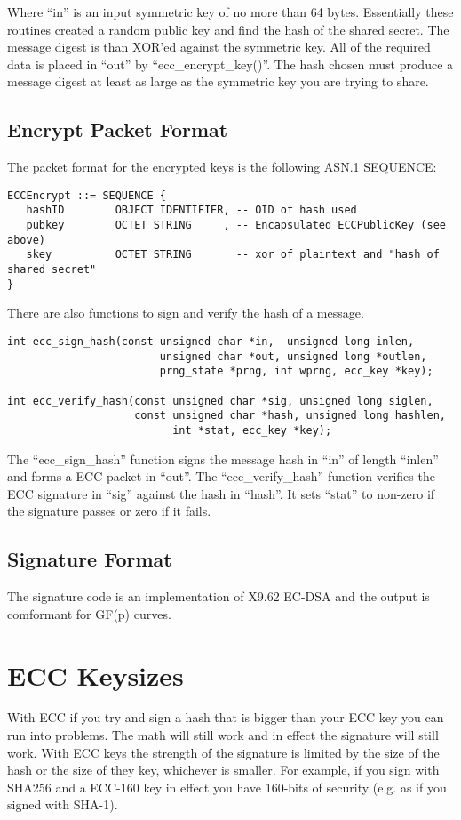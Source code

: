 \documentclass[a4paper]{book}
\begin{document}
Where ``in'' is an input symmetric key of no more than 64 bytes.  Essentially these routines created a random public key
and find the hash of the shared secret.  The message digest is than XOR'ed against the symmetric key.  All of the required
data is placed in ``out'' by ``ecc\_encrypt\_key()''.   The hash chosen must produce a message digest at least as large
as the symmetric key you are trying to share.

\subsection{Encrypt Packet Format}

The packet format for the encrypted keys is the following ASN.1 SEQUENCE:

\begin{verbatim}
ECCEncrypt ::= SEQUENCE {
   hashID        OBJECT IDENTIFIER, -- OID of hash used
   pubkey        OCTET STRING     , -- Encapsulated ECCPublicKey (see above)
   skey          OCTET STRING       -- xor of plaintext and "hash of shared secret"
}
\end{verbatim}

There are also functions to sign and verify the hash of a message.
 
\begin{verbatim}
int ecc_sign_hash(const unsigned char *in,  unsigned long inlen,
                        unsigned char *out, unsigned long *outlen,
                        prng_state *prng, int wprng, ecc_key *key);

int ecc_verify_hash(const unsigned char *sig, unsigned long siglen,
                    const unsigned char *hash, unsigned long hashlen, 
                          int *stat, ecc_key *key);
\end{verbatim}

The ``ecc\_sign\_hash'' function signs the message hash in ``in'' of length ``inlen'' and forms a ECC packet in ``out''.  
The ``ecc\_verify\_hash'' function verifies the ECC signature in ``sig'' against the hash in ``hash''.  It sets ``stat''
to non-zero if the signature passes or zero if it fails.

\subsection{Signature Format}
The signature code is an implementation of X9.62 EC-DSA and the output is comformant for GF(p) curves.

\section{ECC Keysizes}
With ECC if you try and sign a hash that is bigger than your ECC key you can run into problems.  The math will still work
and in effect the signature will still work.  With ECC keys the strength of the signature is limited by the size of
the hash or the size of they key, whichever is smaller.  For example, if you sign with SHA256 and a ECC-160 key in effect
you have 160-bits of security (e.g. as if you signed with SHA-1).  
\end{document}
